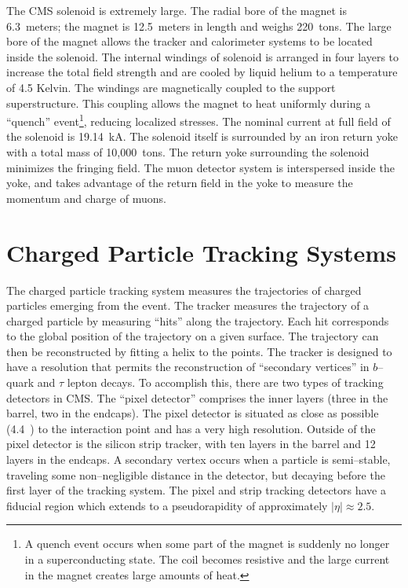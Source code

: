 The CMS solenoid is extremely large.  The radial bore of the magnet is
6.3~meters; the magnet is 12.5~meters in length and weighs 220~tons.  The large
bore of the magnet allows the tracker and calorimeter systems to be located
inside the solenoid.  The internal windings of solenoid is arranged in four
layers to increase the total field strength and are cooled by liquid helium to
a temperature of 4.5 Kelvin.  The windings are magnetically
coupled to the support superstructure.  This coupling allows the magnet to
heat uniformly during a ``quench'' event\footnote{A quench event occurs when some part
of the magnet is suddenly no longer in a superconducting state.  The coil
becomes resistive and the large current in the magnet creates large amounts of
heat.}, reducing localized stresses.  The
nominal current at full field of the solenoid is 19.14~kA.  The solenoid itself
is surrounded by an iron return yoke with a total mass of 10,000~tons.  The
return yoke surrounding the solenoid minimizes the fringing field.  The muon
detector system is interspersed inside the yoke, and takes advantage of the
return field in the yoke to measure the momentum and charge of muons.
%
\section{Charged Particle Tracking Systems}
\label{sec:Tracker}

The charged particle tracking system measures the trajectories of charged
particles emerging from the event.  The tracker measures the trajectory of a
charged particle by measuring ``hits'' along the trajectory.  Each hit
corresponds to the global position of the trajectory on a given surface.  The
trajectory can then be reconstructed by fitting a helix to the points.  The tracker is
designed to have a resolution that permits the reconstruction of ``secondary
vertices'' in $b$--quark and $\tau$ lepton decays.  To accomplish this, there
are two types of tracking detectors in CMS\@.  The ``pixel detector'' comprises
the inner layers (three in the barrel, two in the endcaps).  The pixel detector
is  situated as close as possible (4.4~\cm) to the interaction point and has a
very high resolution. Outside of the pixel detector is the silicon strip
tracker, with ten layers in the barrel and 12 layers in the endcaps.  A
secondary vertex occurs when a particle is semi--stable, traveling some
non--negligible distance in the detector, but decaying before the first layer of
the tracking system.  The pixel and strip tracking detectors have a fiducial
region which extends to a pseudorapidity of approximately $|\eta| \approx 2.5$.

